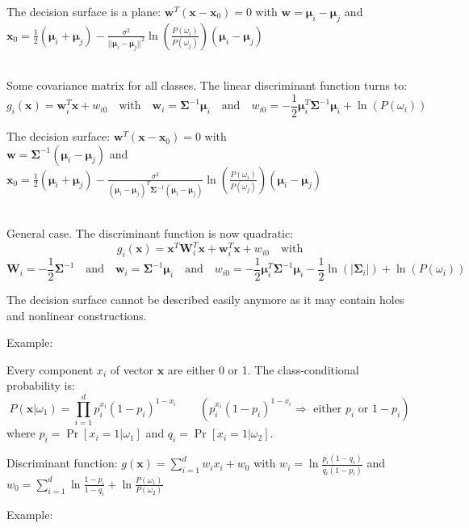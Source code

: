   The decision surface is a plane: $\mathbf{w}^T(\mathbf{x}-\mathbf{x}_0) = 0$ with $\mathbf{w} = \boldsymbol{\mu}_i - \boldsymbol{\mu}_j$ and 
  $\mathbf{x}_0 = \frac{1}{2}(\boldsymbol{\mu}_i+\boldsymbol{\mu}_j) - \frac{\sigma^2}{||\boldsymbol{\mu}_i-\boldsymbol{\mu}_j||^2} \ln\left(\frac{P(\omega_i)}{P(\omega_j)}\right) (\boldsymbol{\mu}_i-\boldsymbol{\mu}_j)$
  
  
  \\
  Some covariance matrix for all classes.
  The linear discriminant function turns to: 
  $$g_i(\mathbf{x}) = \mathbf{w}_i^T \mathbf{x} + w_{i0} \quad \text{with} \quad
  \mathbf{w}_i = \boldsymbol{\Sigma}^{-1}\boldsymbol{\mu}_i \quad \text{and} \quad
  w_{i0} = -\frac{1}{2} \boldsymbol{\mu}_i^T \boldsymbol{\Sigma}^{-1}\boldsymbol{\mu}_i + \ln(P(\omega_i))$$
  
  The decision surface: $\mathbf{w}^T(\mathbf{x}-\mathbf{x}_0) = 0$ \quad with \\
  $\mathbf{w} = \boldsymbol{\Sigma}^{-1} (\boldsymbol{\mu}_i - \boldsymbol{\mu}_j)$ \quad and \quad 
  $\mathbf{x}_0 = \frac{1}{2}(\boldsymbol{\mu}_i+\boldsymbol{\mu}_j) - \frac{\sigma^2}{(\boldsymbol{\mu}_i-\boldsymbol{\mu}_j)^T \boldsymbol{\Sigma}^{-1} (\boldsymbol{\mu}_i-\boldsymbol{\mu}_j)} \ln\left(\frac{P(\omega_i)}{P(\omega_j)}\right) (\boldsymbol{\mu}_i-\boldsymbol{\mu}_j)$
  
  
  \\
  General case.
  The discriminant function is now quadratic: 
  $$g_i(\mathbf{x}) = \mathbf{x}^T \mathbf{W}_i^T \mathbf{x} + \mathbf{w}_i^T \mathbf{x} +w_{i0} \quad\text{with}$$
  $$\mathbf{W}_i = -\frac{1}{2} \boldsymbol{\Sigma}^{-1} \quad\text{and}\quad
  \mathbf{w}_i = \boldsymbol{\Sigma}^{-1}\boldsymbol{\mu}_i \quad\text{and}\quad
  w_{i0} = -\frac{1}{2} \boldsymbol{\mu}_i^T\boldsymbol{\Sigma}^{-1}\boldsymbol{\mu}_i - \frac{1}{2}\ln(|\boldsymbol{\Sigma}_i|) + \ln(P(\omega_i))$$
  
  The decision surface cannot be described easily anymore as it may contain holes and nonlinear constructions.
  
  Example: 
  

  Every component $x_i$ of vector $\mathbf{x}$ are either 0 or 1. The class-conditional probability is:\\
  $$P(\mathbf{x}|\omega_1)=\prod\limits_{i=1}^d p_i^{x_i}(1-p_i)^{1-x_i} \qquad ( p_i^{x_i}(1-p_i)^{1-x_i} \Rightarrow\text{ either }p_i\text{ or }1-p_i)$$
  where $p_i = \operatorname{Pr}\left[x_i=1|\omega_1\right]$ and $q_i = \operatorname{Pr}\left[ x_i=1 | \omega_2 \right]$.
  
  
  Discriminant function: $g(\bm x) = \sum\limits_{i=1}^d w_i x_i + w_0$ with 
  $w_i = \ln \frac{p_i(1-q_i)}{q_i(1-p_i)}$ and 
  $w_0 = \sum\limits_{i=1}^d \ln \frac{1-p_i}{1-q_i} + \ln \frac{P(\omega_1)}{P(\omega_2)}$
  
  Example: 

